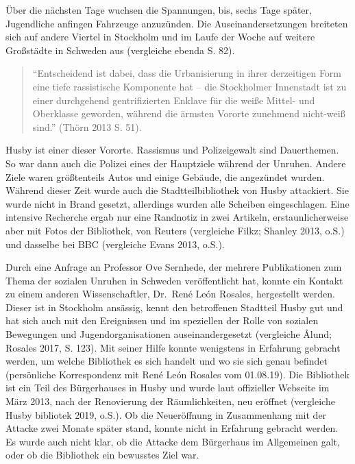 \documentclass[a4paper,
fontsize=11pt,
oneside,
numbers=noperiodatend,
parskip=half-,
bibliography=totoc,
final
]{scrartcl}
\begin{document}
Über die nächsten Tage wuchsen die Spannungen, bis, sechs Tage später,
Jugendliche anfingen Fahrzeuge anzuzünden. Die Auseinandersetzungen
breiteten sich auf andere Viertel in Stockholm und im Laufe der Woche
auf weitere Großstädte in Schweden aus (vergleiche ebenda S. 82).

\begin{quote}
\enquote{Entscheidend ist dabei, dass die Urbanisierung in ihrer
derzeitigen Form eine tiefe rassistische Komponente hat -- die
Stockholmer Innenstadt ist zu einer durchgehend gentrifizierten Enklave
für die weiße Mittel- und Oberklasse geworden, während die ärmsten
Vororte zunehmend nicht-weiß sind.} (Thörn 2013 S. 51).
\end{quote}

Husby ist einer dieser Vororte. Rassismus und Polizeigewalt sind
Dauerthemen. So war dann auch die Polizei eines der Hauptziele während
der Unruhen. Andere Ziele waren größtenteils Autos und einige Gebäude,
die angezündet wurden. Während dieser Zeit wurde auch die
Stadtteilbibliothek von Husby attackiert. Sie wurde nicht in Brand
gesetzt, allerdings wurden alle Scheiben eingeschlagen. Eine intensive
Recherche ergab nur eine Randnotiz in zwei Artikeln, erstaunlicherweise
aber mit Fotos der Bibliothek, von Reuters (vergleiche Filkz; Shanley
2013, o.S.) und dasselbe bei BBC (vergleiche Evans 2013, o.S.).

Durch eine Anfrage an Professor Ove Sernhede, der mehrere Publikationen
zum Thema der sozialen Unruhen in Schweden veröffentlicht hat, konnte
ein Kontakt zu einem anderen Wissenschaftler, Dr.~René León Rosales,
hergestellt werden. Dieser ist in Stockholm ansässig, kennt den
betroffenen Stadtteil Husby gut und hat sich auch mit den Ereignissen
und im speziellen der Rolle von sozialen Bewegungen und
Jugendorganisationen auseinandergesetzt (vergleiche Ålund; Rosales 2017,
S. 123). Mit seiner Hilfe konnte wenigstens in Erfahrung gebracht
werden, um welche Bibliothek es sich handelt und wo sie sich genau
befindet (persönliche Korrespondenz mit René León Rosales vom 01.08.19).
Die Bibliothek ist ein Teil des Bürgerhauses in Husby und wurde laut
offizieller Webseite im März 2013, nach der Renovierung der
Räumlichkeiten, neu eröffnet (vergleiche Husby bibliotek 2019, o.S.). Ob
die Neueröffnung in Zusammenhang mit der Attacke zwei Monate später
stand, konnte nicht in Erfahrung gebracht werden. Es wurde auch nicht
klar, ob die Attacke dem Bürgerhaus im Allgemeinen galt, oder ob die
Bibliothek ein bewusstes Ziel war.
\end{document}
